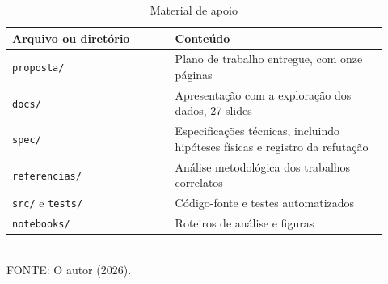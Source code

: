 \begin{table}[htb]
\centering
\caption{Material de apoio}
\label{tab:arquivos}
\footnotesize
\begin{tabular}{@{}p{0.40\linewidth}p{0.52\linewidth}@{}}
\toprule
Arquivo ou diretório & Conteúdo \\
\midrule
\texttt{proposta/} & Plano de trabalho entregue, com onze páginas \\
\texttt{docs/} & Apresentação com a exploração dos dados, 27 slides \\
\texttt{spec/} & Especificações técnicas, incluindo hipóteses físicas e
registro da refutação \\
\texttt{referencias/} & Análise metodológica dos trabalhos correlatos \\
\texttt{src/} e \texttt{tests/} & Código-fonte e testes automatizados \\
\texttt{notebooks/} & Roteiros de análise e figuras \\
\bottomrule
\end{tabular}
\vspace{0.3em}
\\{\footnotesize FONTE: O autor (2026).}
\end{table}

